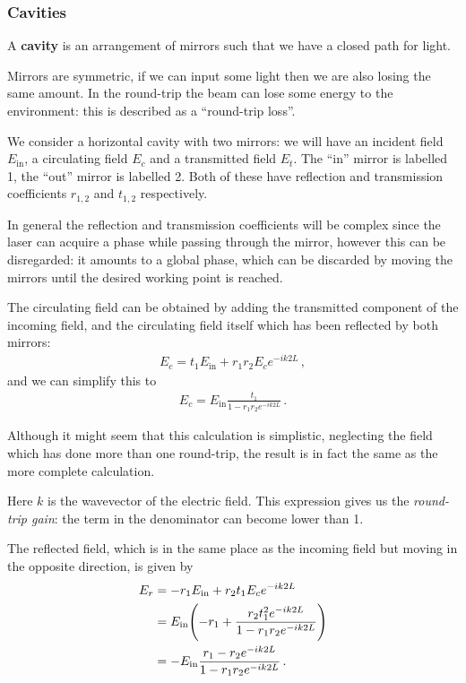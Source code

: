 \documentclass[main.tex]{subfiles}
\begin{document}
\subsubsection{Cavities}

A \textbf{cavity} is an arrangement of mirrors such that we have a closed path for light.

Mirrors are symmetric, if we can input some light then we are also losing the same amount.
In the round-trip the beam can lose some energy to the environment: this is described as a ``round-trip loss''. 

We consider a horizontal cavity with two mirrors: we will have an incident field \(E _{\text{in}}\), a circulating field \(E_{c}\) and a transmitted field \(E_{t}\).
The ``in'' mirror is labelled 1, the ``out'' mirror is labelled 2. Both of these have reflection and transmission coefficients \(r_{1, 2}\) and \(t_{1, 2}\) respectively. 

In general the reflection and transmission coefficients will be complex since the laser can acquire a phase while passing through the mirror, however this can be disregarded: it amounts to a global phase, which can be discarded by moving the mirrors until the desired working point is reached. 

The circulating field can be obtained by adding the transmitted component of the incoming field, and the circulating field itself which has been reflected by both mirrors:
%
\begin{align}
E_{c} = t_1 E _{\text{in}} + r_1 r_2 E_{c} e^{-ik 2L} 
\,,
\end{align}
%
and we can simplify this to 
%
\begin{align}
E_{c} = E _{\text{in}} \frac{t_1 }{1 - r_1 r_2 e^{-ik2L}}
\,.
\end{align}

Although it might seem that this calculation is simplistic, neglecting the field which has done more than one round-trip, the result is in fact the same as the more complete calculation. 

Here \(k\) is the wavevector of the electric field.
This expression gives us the \emph{round-trip gain}: the term in the denominator can become lower than 1. 

The reflected field, which is in the same place as the incoming field but moving in the opposite direction, is given by 
%
\begin{subequations}
\begin{align}
E_{r} &= -r_1 E _{\text{in}} + r_2 t_1 E_{c} e^{-ik2L}  \\
&= E _{\text{in}} \qty(- r_1 + \frac{r_2 t_1^2 e^{-ik2L}}{1 - r_1 r_2 e^{-ik2L}}) \\
&= -E _{\text{in}} \frac{r_1 - r_2 e^{-ik 2L}}{1 - r_1 r_2 e^{-ik2L}}
\,.
\end{align}
\end{subequations}
\end{document}
